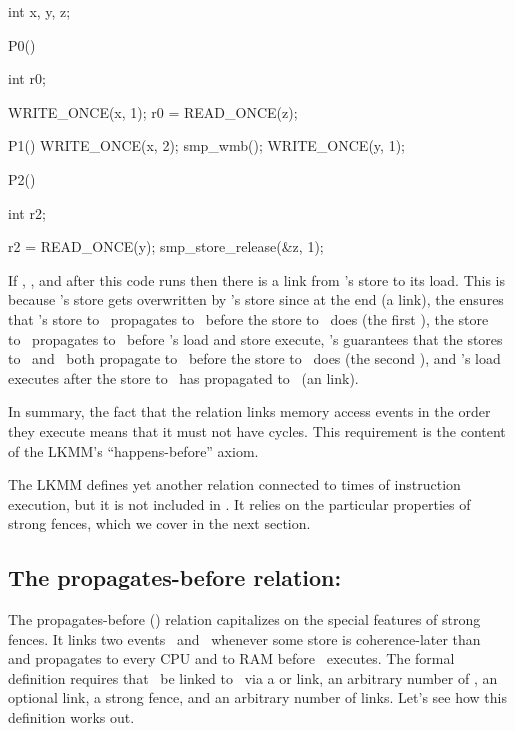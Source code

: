\begin{VerbatimU}
	int x, y, z;

	P0()
	{
		int r0;

		WRITE_ONCE(x, 1);
		r0 = READ_ONCE(z);
	}

	P1()
	{
		WRITE_ONCE(x, 2);
		smp_wmb();
		WRITE_ONCE(y, 1);
	}

	P2()
	{
		int r2;

		r2 = READ_ONCE(y);
		smp_store_release(&z, 1);
	}
\end{VerbatimU}

If , , and  after this code runs
then there is a  link from 's store to its load.
This is because 's store gets overwritten by 's store
since  at the end (a  link), the 
ensures that 's store to~ propagates to~ before the
store to~ does (the first ), the store to~
propagates to~ before 's load and store execute,
's  guarantees that the stores to~
and~ both propagate to~ before the store to~ does
(the second ), and 's load executes after the
store to~ has propagated to~ (an  link).

In summary, the fact that the  relation links memory access events
in the order they execute means that it must not have cycles.
This requirement is the content of the LKMM's ``happens-before'' axiom.

The LKMM defines yet another relation connected to times of
instruction execution, but it is not included in .
It relies on the particular properties of strong fences, which we
cover in the next section.


\subsection{The propagates-before relation: }
\label{sec:docs:explanation:The Propagates-before Relation: pb}

The propagates-before () relation capitalizes on the special
features of strong fences.
It links two events~ and~ whenever some store is
coherence-later than~ and propagates to every CPU and to RAM
before ~executes.
The formal definition requires that ~be linked to~
via a  or  link, an arbitrary number of
, an optional  link, a strong fence, and
an arbitrary number of  links.
Let's see how this definition works out.

